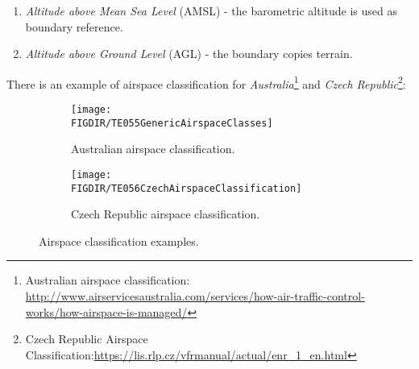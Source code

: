 \begin{enumerate}
    \item \emph{Altitude above Mean Sea Level} (AMSL) - the barometric altitude is used as boundary reference.
    
    \item \emph{Altitude above Ground Level} (AGL) - the boundary copies terrain.
\end{enumerate}

\noindent There is an example of airspace classification for \emph{Australia}\footnote{Australian airspace classification: \url{http://www.airservicesaustralia.com/services/how-air-traffic-control-works/how-airspace-is-managed/}} and \emph{Czech Republic}\footnote{Czech Republic Airspace Classification:\url{https://lis.rlp.cz/vfrmanual/actual/enr_1_en.html}}:


\begin{figure}[H]
	\centering
	\begin{subfigure}{0.44\textwidth}
		\texttt{[image: \\FIGDIR/TE055GenericAirspaceClasses]}
		\caption{Australian airspace classification.} 
	\end{subfigure}
	\vspace{1em} 
	\begin{subfigure}{0.48\textwidth} %
		\texttt{[image: \\FIGDIR/TE056CzechAirspaceClassification]}
		\caption{Czech Republic airspace classification.} %
	\end{subfigure}
	\caption{Airspace classification examples.} %
\end{figure}

